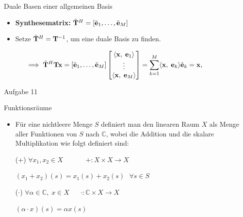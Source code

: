 \documentclass[14pt, aspectratio=169, handout]{beamer}
\begin{document}
\begin{frame}{Duale Basen einer allgemeinen Basis}
    \begin{itemize}
        \item \textbf{Synthesematrix:} $\Tilde{\mathbf{T}}^H = \left[\Tilde{\mathbf{e}}_1, \dots,\Tilde{\mathbf{e}}_M \right]$
        \item[] 
        \item Setze $\Tilde{\mathbf{T}}^H = \mathbf{T}^{-1}$, um eine duale Basis zu finden.
        \item[] 
    \end{itemize}
    $$\hspace{-1cm}\implies \Tilde{\mathbf{T}}^H \mathbf{T} \mathbf{x} = \left[\Tilde{\mathbf{e}}_1, \dots,\Tilde{\mathbf{e}}_M \right] \begin{bmatrix}
        \langle \mathbf{x}, \; \mathbf{e}_1 \rangle \\
        \vdots \\
        \langle \mathbf{x}, \; \mathbf{e}_M \rangle
    \end{bmatrix} = \sum_{k=1}^M \langle \mathbf{x}, \; \mathbf{e}_k \rangle \Tilde{\mathbf{e}}_k = \mathbf{x}, \hspace{5pt}$$
\end{frame}

\begin{frame}{Aufgabe 11}
    
\end{frame}

\begin{frame}{Funktionsräume}

\begin{itemize}
    \item Für eine nichtleere Menge $S$ definiert man den linearen Raum $X$ als Menge aller Funktionen von $S$ nach $\mathbb{C}$, wobei die Addition und die skalare Multiplikation wie folgt definiert sind:
    \item[] 
    \item[(+)] $\forall x_1, x_2 \in X \hspace{40pt} +:X \times X \to X \hspace{12pt} $
    \item[] $(x_1 + x_2)(s) = x_1(s) + x_2(s) \hspace{8pt} \forall s \in S$
    \item[] 
    \item[($\cdot$)] $\forall \alpha \in \mathbb{C}, \; x \in X \hspace{20pt} \cdot : \mathbb{C} \times X \to X \hspace{14pt} $
    \item[] $(\alpha \cdot x)(s) = \alpha x(s)$
\end{itemize}
\end{frame}
\end{document}
